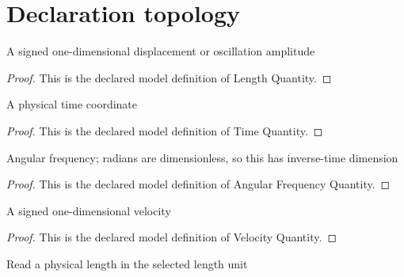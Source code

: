 \section{Declaration topology}
\begin{definition}
  \label{def:physics:phyx-mini-0251:phyxminiproblems-problemphyxmini0251-lengthquantity}
  A signed one-dimensional displacement or oscillation amplitude
\end{definition}
\begin{proof}
  This is the declared model definition of Length Quantity.
\end{proof}
\begin{definition}
  \label{def:physics:phyx-mini-0251:phyxminiproblems-problemphyxmini0251-timequantity}
  A physical time coordinate
\end{definition}
\begin{proof}
  This is the declared model definition of Time Quantity.
\end{proof}
\begin{definition}
  \label{def:physics:phyx-mini-0251:phyxminiproblems-problemphyxmini0251-angularfrequencyquantity}
  Angular frequency; radians are dimensionless, so this has inverse-time dimension
\end{definition}
\begin{proof}
  This is the declared model definition of Angular Frequency Quantity.
\end{proof}
\begin{definition}
  \label{def:physics:phyx-mini-0251:phyxminiproblems-problemphyxmini0251-velocityquantity}
  A signed one-dimensional velocity
\end{definition}
\begin{proof}
  This is the declared model definition of Velocity Quantity.
\end{proof}
\begin{definition}
  \label{def:physics:phyx-mini-0251:phyxminiproblems-problemphyxmini0251-lengthreadout}
  Read a physical length in the selected length unit
\end{definition}

